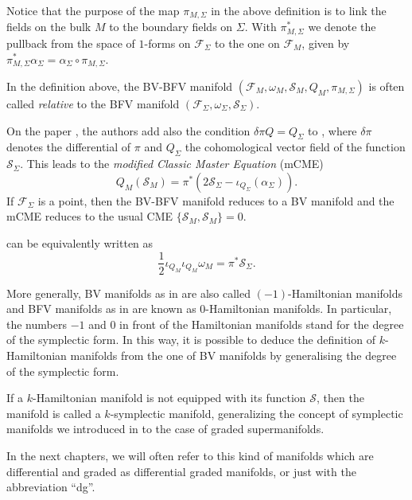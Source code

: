 Notice that the purpose of the map $\pi_{M, \Sigma}$ in the above definition is to link the fields on the bulk $M$ to the boundary fields on $\Sigma$.
With $\pi_{M,\Sigma}^*$ we denote the pullback from the space of $1$-forms on $\mathcal{F}_\Sigma$ to the one on $\mathcal{F}_M$, given by $\pi_{M,\Sigma}^* \alpha_\Sigma = \alpha_\Sigma \circ \pi_{M,\Sigma}$.

In the definition above, the BV-BFV manifold $(\mathcal{F}_M, \omega_M, \mathcal{S}_M, Q_M, \pi_{M, \Sigma})$ is often called \emph{relative} to the BFV manifold $(\mathcal{F}_\Sigma, \omega_\Sigma, \mathcal{S}_\Sigma)$.

On the paper \cite{mCME}, the authors add also the condition $\delta \pi Q = Q_\Sigma$ to , where $\delta \pi$ denotes the differential of $\pi$ and $Q_\Sigma$ the cohomological vector field of the function $\mathcal{S}_\Sigma$.
This leads to the \emph{modified Classic Master Equation} (mCME)
\begin{equation}
\label{eq:mCME}
    Q_M (\mathcal{S}_M) = \pi ^* (2 \mathcal{S}_\Sigma - \iota_{Q_\Sigma}(\alpha_\Sigma)).
\end{equation}
If $\mathcal{F}_\Sigma$ is a point, then the BV-BFV manifold reduces to a BV manifold and the mCME reduces to the usual CME $\{\mathcal{S}_M, \mathcal{S}_M\} = 0$.

 can be equivalently written as
\begin{equation*}
    \frac{1}{2} \iota_{Q_M} \iota_{Q_M} \omega_M =  \pi^* \mathcal{S}_\Sigma .
\end{equation*}

More generally, BV manifolds as in  are also called $(-1)$-Hamiltonian manifolds and BFV manifolds as in  are known as $0$-Hamiltonian manifolds.
In particular, the numbers $-1$ and $0$ in front of the Hamiltonian manifolds stand for the degree of the symplectic form.
In this way, it is possible to deduce the definition of $k$-Hamiltonian manifolds from the one of BV manifolds by generalising the degree of the symplectic form.

If a $k$-Hamiltonian manifold is not equipped with its function $\mathcal{S}$, then the manifold is called a $k$-symplectic manifold, generalizing the concept of symplectic manifolds we introduced in  to the case of graded supermanifolds.

In the next chapters, we will often refer to this kind of manifolds which are differential and graded as differential graded manifolds, or just with the abbreviation “dg”.